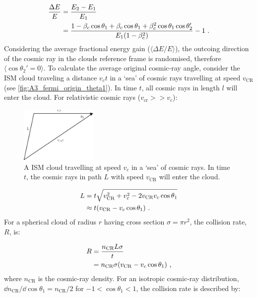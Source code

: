 \begin{equation}
    \begin{aligned}
        \frac{\Delta E}{E}&=\frac{E_2-E_1}{E_1} \\
        &=\frac{1-\beta_c\cos\theta_1+\beta_c\cos\theta_1+\beta_c^2\cos\theta_1\cos\theta_2'}{E_1\qty(1-\beta_c^2)}-1\text{ .}
    \end{aligned}
\end{equation}
\noindent Considering the average fractional energy gain ($\langle \Delta E/E \rangle$), the outcoing direction of the cosmic ray in the clouds reference frame is randomised, therefore $\langle \cos\theta_2'=0 \rangle$. To calculate the average original cosmic-ray angle, consider the ISM cloud traveling a distance $v_ct$ in a `sea' of cosmic rays travelling at speed $v_\text{CR}$ (see \autoref{fig:A3_fermi_origin_theta1}). In time $t$, all cosmic rays in length $l$ will enter the cloud. For relativistic cosmic rays ($v_\text{cr}>>v_c$):
\begin{figure}
    \centering
    \includegraphics[width=0.33\textwidth]{A3_Diffusive_Shock_Acceleration/Images/fermi_original_theta1.png}
    \caption{A ISM cloud travelling at speed $v_c$ in a `sea' of cosmic rays. In time $t$, the cosmic rays in path $L$ with speed $v_\text{CR}$ will enter the cloud.}
    \label{fig:A3_fermi_origin_theta1}
\end{figure}
\begin{equation}
    \begin{aligned}
        L&=t\sqrt{v_\text{CR}^2+v_c^2-2v_\text{CR}v_c\cos\theta_1} \\
        &\approx t\qty(v_\text{CR}-v_c\cos\theta_1) \text{ .}
    \end{aligned}
\end{equation}
\noindent For a spherical cloud of radius $r$ having cross section $\sigma=\pi r^2$, the collision rate, $R$, is:

\begin{equation}
    \begin{aligned}
        R&=\frac{n_\text{CR}L\sigma}{t} \\
        &=n_\text{CR}\sigma\qty(v_\text{CR}-v_c\cos\theta_1) \text { ,}
    \end{aligned}
\end{equation}
\noindent where $n_\text{CR}$ is the cosmic-ray density. For an isotropic cosmic-ray distribution, $\dd{n_\text{CR}}/\dd{\cos\theta_1}=n_\text{CR}/2$ for $-1<\cos\theta_1<1$, the collision rate is described by:

